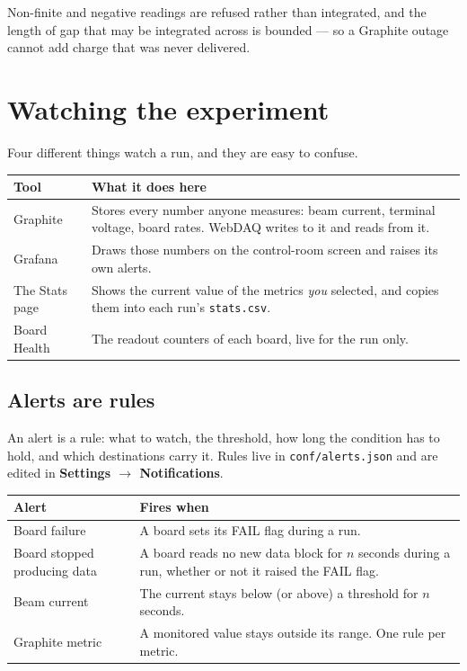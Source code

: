 \documentclass[11pt,a4paper]{report}
\newcommand{\ui}[1]{\textbf{#1}}          %
\newcommand{\file}[1]{\texttt{#1}}
\begin{document}
Non-finite and negative readings are refused rather than integrated, and the
length of gap that may be integrated across is bounded --- so a Graphite outage
cannot add charge that was never delivered.

\chapter{Watching the experiment}
\label{ch:watching}

Four different things watch a run, and they are easy to confuse.

\begin{center}
\begin{tabular}{@{}L{0.24\textwidth}L{0.68\textwidth}@{}}
\toprule
\textbf{Tool} & \textbf{What it does here} \\
\midrule
Graphite & Stores every number anyone measures: beam current, terminal voltage,
board rates. WebDAQ writes to it and reads from it. \\
Grafana & Draws those numbers on the control-room screen and raises its own
alerts. \\
The Stats page & Shows the current value of the metrics \emph{you} selected, and
copies them into each run's \file{stats.csv}. \\
Board Health & The readout counters of each board, live for the run only. \\
\bottomrule
\end{tabular}
\end{center}

\section{Alerts are rules}

An alert is a rule: what to watch, the threshold, how long the condition has to
hold, and which destinations carry it. Rules live in \file{conf/alerts.json} and
are edited in \ui{Settings $\rightarrow$ Notifications}.

\begin{center}
\begin{tabular}{@{}L{0.30\textwidth}L{0.62\textwidth}@{}}
\toprule
\textbf{Alert} & \textbf{Fires when} \\
\midrule
Board failure & A board sets its FAIL flag during a run. \\
Board stopped producing data & A board reads no new data block for $n$ seconds
during a run, whether or not it raised the FAIL flag. \\
Beam current & The current stays below (or above) a threshold for $n$ seconds. \\
Graphite metric & A monitored value stays outside its range. One rule per
metric. \\
\bottomrule
\end{tabular}
\end{center}
\end{document}
